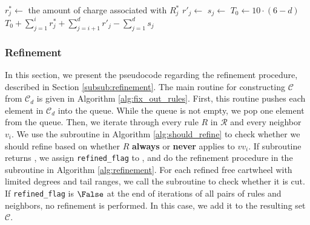 \documentclass[main.tex]{subfiles}
\begin{document}
\begin{algorithm}[H]
    \caption{\upperBoundOfChargeWithLink($(Z_C, \delta_C^-, \delta_C^+), \{R^*_j\}_{j=1}^i, \mathcal{R}, \mathcal{R}^{*-\mathcal{D}}$)}
    \label{alg:upperbound_of_charge}
    \begin{algorithmic}[1]
            \State $r_j^* \gets$ the amount of charge associated with $R^*_j$
        \EndFor
            \State $r'_j \gets$ 
        \EndFor
            \State $s_j \gets$ 
        \EndFor
        \State $T_0 \gets 10 \cdot (6 - d)$
        \State \Return $T_0 + \sum_{j=1}^i r^*_j + \sum_{j=i+1}^d r'_j - \sum_{j=1}^d s_j$
    \end{algorithmic}
\end{algorithm}


\subsubsection{Refinement}
In this section, we present the pseudocode regarding the refinement procedure, described in Section \ref{subsub:refinement}.
The main routine for constructing $\mathcal{C}$ from $\mathcal{C}_d$ is given in Algorithm \ref{alg:fix_out_rules}.
First, this routine pushes each element in $\mathcal{C}_d$ into the queue.
While the queue is not empty, we pop one element from the queue.
Then, we iterate through every rule $R$ in $\mathcal{R}$ and every neighbor $v_i$.
We use the \shouldRefine subroutine in Algorithm \ref{alg:should_refine} to check whether we should refine based on whether $R$ {\bf always} or {\bf never} applies to $vv_i$.
If \shouldRefine subroutine returns \True, we assign \texttt{refined\_flag} to \True, and do the refinement procedure in the  subroutine in Algorithm \ref{alg:refinement}.
For each refined free cartwheel with limited degrees and tail ranges, we call the \prune subroutine to check whether it is cut.
If \texttt{refined\_flag} is $\False$ at the end of iterations of all pairs of rules and neighbors, no refinement is performed.
In this case, we add it to the resulting set $\mathcal{C}$.
\end{document}
